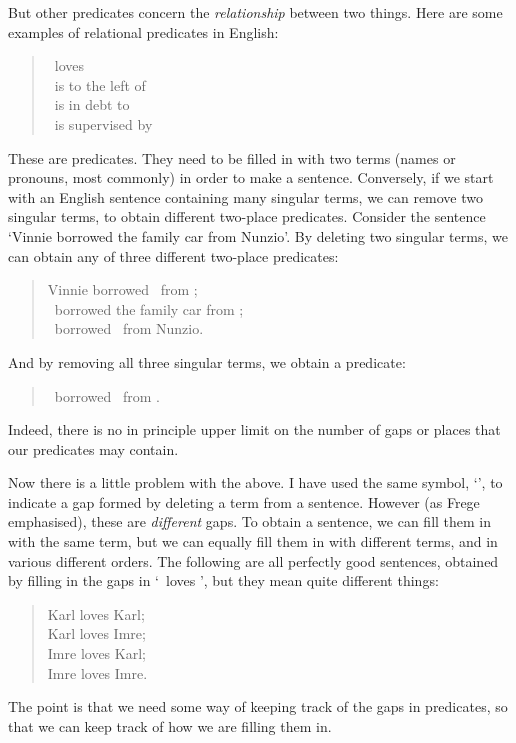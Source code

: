 But other predicates concern the \emph{relationship} between two things. Here are some examples of relational predicates in English:
	\begin{quote}
		\blank\ loves \blank\\
		\blank\ is to the left of \blank\\
		\blank\ is in debt to \blank\\
		\blank\ is supervised by \blank
	\end{quote}
These are  predicates. They need to be filled in with two terms (names or pronouns, most commonly) in order to make a sentence. Conversely, if we start with an English sentence containing many singular terms, we can remove two singular terms, to obtain different two-place predicates. Consider the sentence `Vinnie borrowed the family car from Nunzio'. By deleting two singular terms, we can obtain any of three different two-place predicates:
	\begin{quote}
		Vinnie borrowed \blank\ from \blank;\\
		\blank\ borrowed the family car from \blank;\\
		\blank\ borrowed \blank\ from Nunzio.
	\end{quote}
And by removing all three singular terms, we  obtain a  predicate:
	\begin{quote}
		\blank\ borrowed \blank\ from \blank.
	\end{quote}
Indeed, there is no in principle upper limit on the number of gaps or places that our predicates may contain.

Now there is a little problem with the above. I have used the same symbol, `\blank', to indicate a gap formed by deleting a term from a sentence. However (as Frege emphasised), these are \emph{different} gaps. To obtain a sentence, we can fill them in with the same term, but we can equally fill them in with different terms, and in various different orders. The following are all perfectly good sentences, obtained by filling in the gaps in `\blank\ loves \blank', but they mean quite different things:
	\begin{quote}
		Karl loves Karl;\\
		Karl loves Imre;\\
		Imre loves Karl;\\
		Imre loves Imre.
	\end{quote}
The point is that we need some way of keeping track of the gaps in predicates, so that we can keep track of how we are filling them in. 

